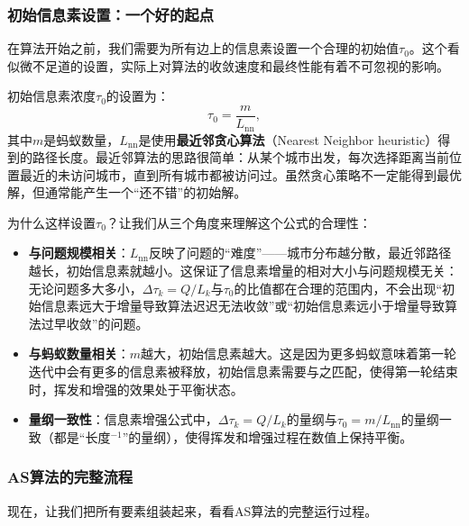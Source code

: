 \documentclass[lang=cn,zihao=-4,a4paper,fontset=windows]{beautybook}
\begin{document}
\subsubsection{初始信息素设置：一个好的起点}

在算法开始之前，我们需要为所有边上的信息素设置一个合理的初始值$\tau_0$。这个看似微不足道的设置，实际上对算法的收敛速度和最终性能有着不可忽视的影响。

\begin{definition}[][初始信息素]
初始信息素浓度$\tau_0$的设置为：
\[
\tau_0 = \frac{m}{L_{\text{nn}}},
\]
其中$m$是蚂蚁数量，$L_{\text{nn}}$是使用\textbf{最近邻贪心算法}（Nearest Neighbor heuristic）得到的路径长度。最近邻算法的思路很简单：从某个城市出发，每次选择距离当前位置最近的未访问城市，直到所有城市都被访问过。虽然贪心策略不一定能得到最优解，但通常能产生一个“还不错”的初始解。
\end{definition}

为什么这样设置$\tau_0$？让我们从三个角度来理解这个公式的合理性：
\begin{itemize}
    \item \textbf{与问题规模相关}：$L_{\text{nn}}$反映了问题的“难度”——城市分布越分散，最近邻路径越长，初始信息素就越小。这保证了信息素增量的相对大小与问题规模无关：无论问题多大多小，$\Delta\tau_k = Q/L_k$与$\tau_0$的比值都在合理的范围内，不会出现“初始信息素远大于增量导致算法迟迟无法收敛”或“初始信息素远小于增量导致算法过早收敛”的问题。
    \item \textbf{与蚂蚁数量相关}：$m$越大，初始信息素越大。这是因为更多蚂蚁意味着第一轮迭代中会有更多的信息素被释放，初始信息素需要与之匹配，使得第一轮结束时，挥发和增强的效果处于平衡状态。
    \item \textbf{量纲一致性}：信息素增强公式中，$\Delta\tau_k = Q/L_k$的量纲与$\tau_0 = m/L_{\text{nn}}$的量纲一致（都是“长度$^{-1}$”的量纲），使得挥发和增强过程在数值上保持平衡。
\end{itemize}

\subsubsection{AS算法的完整流程}

现在，让我们把所有要素组装起来，看看AS算法的完整运行过程。
\end{document}
